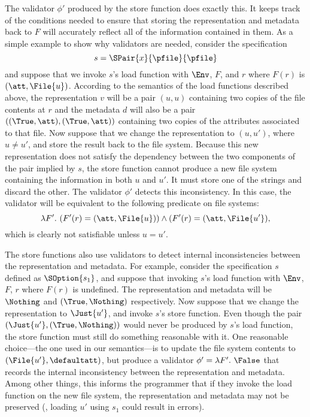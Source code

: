 The validator $\phi'$ produced by the store function does exactly
this. It keeps track of the conditions needed to ensure that storing
the representation and metadata back to $F$ will accurately reflect
all of the information contained in them. As a simple example to show
why validators are needed, consider the specification
%
\[ s = \SPair{x}{\pfile}{\pfile}
\]
% 
and suppose that we invoke $s$'s load function with $\Env$, $F$, and
$r$ where $F(r)$ is $(\att,\File{u})$. According to the semantics of
the load functions described above, the representation $v$ will be a
pair $(u,u)$ containing two copies of the file contents at $r$ and the
metadata $d$ will also be a pair $((\True,\att),(\True,\att))$
containing two copies of the attributes associated to that file. Now
suppose that we change the representation to $(u,u')$, where $u \neq
u'$, and store the result back to the file system. Because this new
representation does not satisfy the dependency between the two
components of the pair implied by $s$, the store function cannot
produce a new file system containing the information in both $u$ and
$u'$. It must store one of the strings and discard the other. The
validator $\phi'$ detects this inconsistency. In this case, the
validator will be equivalent to the following predicate on file
systems:
%
\[
\lambda F'.~ (F'(r) = (\att,\File{u})) \wedge (F'(r) = (\att,\File{u'}),
\]
%
which is clearly not satisfiable unless $u = u'$.

The store functions also use validators to detect internal
inconsistencies between the representation and metadata. For example,
consider the specification $s$ defined as $\SOption{s_1}$, and
suppose that invoking $s$'s load function with $\Env$, $F$, $r$ where
$F(r)$ is undefined. The representation and metadata will be
$\Nothing$ and $(\True,\Nothing)$ respectively. Now suppose that we
change the representation to $\Just{u'}$, and invoke $s$'s store
function. Even though the pair $(\Just{u'}, (\True,\Nothing))$ would
never be produced by $s$'s load function, the store function must
still do something reasonable with it. One reasonable choice---the one
used in our semantics---is to update the file system contents to
$(\File{u'},\defaultatt)$, but produce a validator $\phi' = \lambda
F'.~ \False$ that records the internal inconsistency between the
representation and metadata. Among other things, this informs the
programmer that if they invoke the load function on the new file
system, the representation and metadata may not be preserved (\eg,
loading $u'$ using $s_1$ could result in errors).


